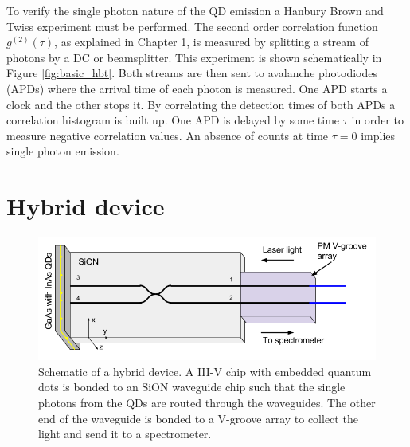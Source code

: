 To verify the single photon nature of the QD emission a Hanbury Brown and Twiss
experiment must be performed\cite{brown1956test}. The second order correlation function
$g^{(2)}(\tau)$, as explained in Chapter 1, is measured by splitting a stream of
photons by a DC or beamsplitter. This experiment is shown schematically in
Figure \ref{fig:basic_hbt}.  Both streams are then sent to avalanche photodiodes
(APDs) where the arrival time of each photon is measured. One APD starts a clock
and the other stops it. By correlating the detection times of both APDs a correlation
histogram is built up. One APD is delayed by some time $\tau$ in order to
measure negative correlation values. An absence of counts at time $\tau = 0$
implies single photon emission.

\section{Hybrid device}

\begin{figure}[h!] \begin{center}
\includegraphics[width=1\textwidth]{images/hyb_basic.png} \caption{
Schematic of a hybrid device. A III-V chip with embedded quantum dots is bonded
to an SiON waveguide chip such that the single photons from the QDs are routed
through the waveguides. The other end of the waveguide is bonded to a V-groove
array to collect the light and send it to a spectrometer.
} \label{fig:hyb_basic} \end{center} \end{figure}

